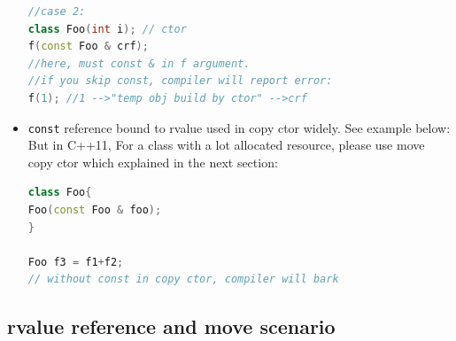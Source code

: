 \documentclass[a4paper,12pt,twoside]{book}
\begin{document}
\begin{itemize}
\begin{lstlisting}[frame=single, language=c++]
//case 2:
class Foo(int i); // ctor
f(const Foo & crf);
//here, must const & in f argument.
//if you skip const, compiler will report error:
f(1); //1 -->"temp obj build by ctor" -->crf
\end{lstlisting}

\item \texttt{const} reference bound to rvalue used in copy ctor widely. See example below: But in C++11, For a class with a lot allocated resource, please use move copy ctor which explained in the next section:

\begin{lstlisting}[frame=single, language=c++]
class Foo{
Foo(const Foo & foo);
}

Foo f3 = f1+f2;
// without const in copy ctor, compiler will bark
\end{lstlisting}
\end{itemize}

\subsection{rvalue reference and move scenario}
\end{document}
